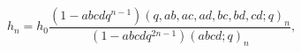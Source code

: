 \[h_{n}=h_{0}\frac{(1-abcdq^{n-1})\left(q,ab,ac,ad,bc,bd,cd;q\right)_{n}}{(1-%
abcdq^{2n-1})\left(abcd;q\right)_{n}},\]